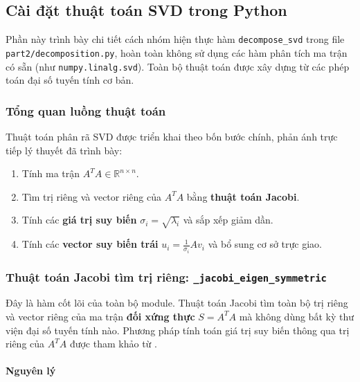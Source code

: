 \subsection{Cài đặt thuật toán SVD trong Python}

Phần này trình bày chi tiết cách nhóm hiện thực hàm \texttt{decompose\_svd} trong file \texttt{part2/decomposition.py}, hoàn toàn không sử dụng các hàm phân tích ma trận có sẵn (như \texttt{numpy.linalg.svd}). Toàn bộ thuật toán được xây dựng từ các phép toán đại số tuyến tính cơ bản.

\subsubsection{Tổng quan luồng thuật toán}

Thuật toán phân rã SVD được triển khai theo bốn bước chính, phản ánh trực tiếp lý thuyết đã trình bày:

\begin{enumerate}
    \item Tính ma trận $A^T A \in \mathbb{R}^{n \times n}$.
    \item Tìm trị riêng và vector riêng của $A^T A$ bằng \textbf{thuật toán Jacobi}.
    \item Tính các \textbf{giá trị suy biến} $\sigma_i = \sqrt{\lambda_i}$ và sắp xếp giảm dần.
    \item Tính các \textbf{vector suy biến trái} $u_i = \frac{1}{\sigma_i} A v_i$ và bổ sung cơ sở trực giao.
\end{enumerate}

\subsubsection{Thuật toán Jacobi tìm trị riêng: \texttt{\_jacobi\_eigen\_symmetric}}

Đây là hàm cốt lõi của toàn bộ module. Thuật toán Jacobi tìm toàn bộ trị riêng và vector riêng của ma trận \textbf{đối xứng thực} $S = A^T A$ mà không dùng bất kỳ thư viện đại số tuyến tính nào. Phương pháp tính toán giá trị suy biến thông qua trị riêng của $A^T A$ được tham khảo từ \cite{golub, trefethen}.

\paragraph{Nguyên lý}

